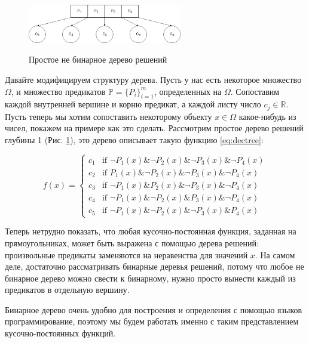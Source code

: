\documentclass[12pt,a4paper]{article}
\newcommand{\figref}[1]{(Рис. \ref{#1})}
\begin{document}
\begin{figure}[h]
\centering
\includegraphics[width=0.6\textwidth]{../resources/decision_tree.png}
\label{fig:dectree}
\caption{Простое не бинарное дерево решений}
\end{figure}

Давайте модифицируем структуру дерева. Пусть у нас есть некоторое множество $\Omega$, и множество предикатов $\mathbb P = \{P_i\}_{i=1}^m$, определенных на $\Omega$. Сопоставим каждой внутренней вершине и корню предикат, а каждой листу число $c_j \in \mathbb R$. Пусть теперь мы хотим сопоставить некоторому объекту $x \in \Omega$ какое-нибудь из чисел, покажем на примере как это сделать. Рассмотрим простое дерево решений глубины 1 \figref{fig:dectree}, это дерево описывает такую функцию \eqref{eq:dectree}:

\begin{equation}
\label{eq:dectree}
f(x) = 
\begin{cases}
c_1 & \mbox{if }  \neg P_1(x) \& \neg P_2(x) \& \neg P_3(x) \& \neg P_4(x) \\
c_2 & \mbox{if }  P_1(x) \& \neg P_2(x) \& \neg P_3(x) \& \neg P_4(x) \\
c_3 & \mbox{if }  \neg P_1(x) \& P_2(x) \& \neg P_3(x) \& \neg P_4(x) \\
c_4 & \mbox{if }  \neg P_1(x) \& \neg P_2(x) \& P_3(x) \& \neg P_4(x) \\
c_5 & \mbox{if }  \neg P_1(x) \& \neg P_2(x) \& \neg P_3(x) \& P_4(x)
\end{cases}
\end{equation}

Теперь нетрудно показать, что любая кусочно-постоянная функция, заданная на прямоугольниках, может быть выражена с помощью дерева решений: произвольные предикаты заменяются на неравенства для значений $x$. На самом деле, достаточно рассматривать бинарные деревья решений, потому что любое не бинарное дерево можно свести к бинарному, нужно просто вынести каждый из предикатов в отдельную вершину.\par

Бинарное дерево очень удобно для построения и определения с помощью языков программирование, поэтому мы будем работать именно с таким представлением кусочно-постоянных функций.
\end{document}
